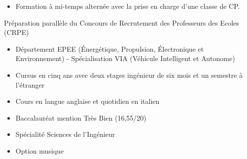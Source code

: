\documentclass[10pt,a4paper,ragged2e,withhyper,normalphoto]{altacv}
\begin{document}
\begin{paracol}{2}


\begin{itemize}
	\item Formation à mi-temps alternée avec la prise en charge d'une classe de CP.
\end{itemize}

\divider

Préparation parallèle du Concours de Recrutement des Professeurs des Ecoles (CRPE)

\divider

\begin{itemize}
	\item Département EPEE (\'{E}nergétique, Propulsion, \'{E}lectronique et Environnement) - Spécialisation VIA (Véhicule Intelligent et Autonome)
	\item Cursus en cinq ans avec deux stages ingénieur de six mois et un semestre à l'étranger
\end{itemize}

\divider

\begin{itemize}
	\item Cours en langue anglaise et quotidien en italien
\end{itemize}

\divider

\begin{itemize}
	\item Baccalauréat mention Très Bien (16,55/20)
	\item Spécialité Sciences de l'Ingénieur
	\item Option musique
\end{itemize}


\end{paracol}
\end{document}
